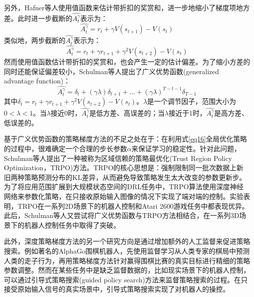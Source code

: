 \documentclass[bachelor]{thesis-uestc}
\begin{document}
	另外，Hafner等人使用值函数来估计带折扣的奖赏和，进一步地缩小了梯度项地方差。此时进一步截断的$\hat{A_t^\gamma}$表示为：
	\begin{equation}
		\label{eq20}
		\hat{A_t^\gamma}=r_t+\gamma V(s_{t+1})-V(s_t)
	\end{equation}
	类似地，两步截断的$\hat{A_t^\gamma}$表示为：
	\begin{equation}
		\label{eq21}
		\hat{A_t^\gamma}=r_t+\gamma r_{t+1}+\gamma^2V(s_{t+2})-V(s_t)
	\end{equation}
	然而使用值函数估计带折扣的奖赏和，也会产生一定的估计偏差。为了缩小方差的同时还能保证偏差较小，Schulman等人提出了广义优势函数(generalized advantage function)：
	\begin{equation}
		\label{eq22}
		\hat{A_t^\gamma}=\delta_t+(\gamma\lambda)\delta_{t+1}+\dots+(\gamma\lambda)^{T-t-1}\delta_{T-1}
	\end{equation}
	其中$\delta_t=r_t+\gamma r_{t+1}+\gamma^2V(s_{t+2})-V(s_t)$。$\lambda$是一个调节因子，范围大小为$0<\lambda<1$。当$\lambda$接近0时，$\hat{A_t^\gamma}$是低方差、高误差的；当$\lambda$接近于1时，$\hat{A_t^\gamma}$是高方差、低误差的。
	
	基于广义优势函数的策略梯度方法的不足之处在于：在利用式\ref{eq16}全局优化策略的过程中，很难确定一个合理的步长参数$\alpha$来保证学习的稳定性。针对此问题，Schulman等人提出了一种被称为区域信赖的策略最优化(Trust Region Policy Optimization，TRPO)方法。TRPO的核心思想是：强制限制同一批次数据上新旧两种策略预测分布的KL差异，从而避免导致策略发生太大改变的参数更新步。为了将应用范围扩展到大规模状态空间的DRL任务中，TRPO算法使用深度神经网络来参数化策略，在只接收原始输入图像的情况下实现了端对端的控制。实验表明，TRPO在一系列2D场景下的机器人控制和Atari 2600游戏任务中都表现优异。此后，Schulman等人又尝试将广义优势函数与TRPO方法相结合，在一系列3D场景下的机器人控制任务中取得了突破。
	
	此外，深度策略梯度方法的另一个研究方向是通过增加额外的人工监督来促进策略搜索。例如著名的AlphaGo围棋机器人，先使用监督学习从人类专家的棋局中预测人类的走子行为，再用策略梯度方法针对赢得围棋比赛的真实目标进行精细的策略参数调整。然而在某些任务中是缺乏监督数据的，比如现实场景下的机器人控制，可以通过引导式策略搜索(guided policy search)方法来监督策略搜索的过程。在只接受原始输入信号的真实场景中，引导式策略搜索实现了对机器人的操控。
	
\end{document}
